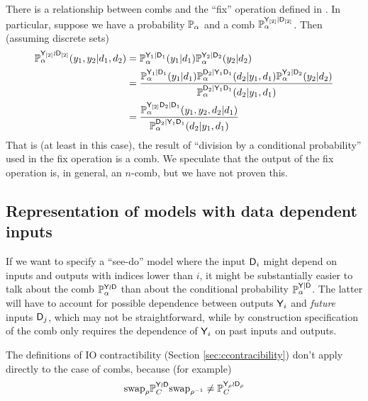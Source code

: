 There is a relationship between combs and the ``fix'' operation defined in \citet{richardson_nested_2017}. In particular, suppose we have a probability $\mathbb{P}_\alpha$ and a comb $\mathbb{P}_\alpha^{\mathsf{Y}_{[2]}|\mathsf{D}_{[2]}}$. Then (assuming discrete sets)
\begin{align}
    \mathbb{P}_\alpha^{\mathsf{Y}_{[2]}\wr \mathsf{D}_{[2]}}(y_1,y_2|d_1,d_2) &= \mathbb{P}_\alpha^{\mathsf{Y}_1|\mathsf{D}_1}(y_1|d_1)\mathbb{P}_\alpha^{\mathsf{Y}_2|\mathsf{D}_2}(y_2|d_2)\\
    &= \frac{\mathbb{P}_\alpha^{\mathsf{Y}_1|\mathsf{D}_1}(y_1|d_1)\mathbb{P}_\alpha^{\mathsf{D}_2|\mathsf{Y}_1\mathsf{D}_1}(d_2|y_1,d_1)\mathbb{P}_\alpha^{\mathsf{Y}_2|\mathsf{D}_2}(y_2|d_2)}{\mathbb{P}_\alpha^{\mathsf{D}_2|\mathsf{Y}_1\mathsf{D}_1}(d_2|y_1,d_1)}\\
    &= \frac{\mathbb{P}_\alpha^{\mathsf{Y}_{[2]}\mathsf{D}_2|\mathsf{D}_1}(y_1,y_2,d_2|d_1)}{\mathbb{P}_\alpha^{\mathsf{D}_2|\mathsf{Y}_1\mathsf{D}_1}(d_2|y_1,d_1)}
\end{align}
That is (at least in this case), the result of ``division by a conditional probability'' used in the fix operation is a comb. We speculate that the output of the fix operation is, in general, an $n$-comb, but we have not proven this.


\subsection[Representation of data-dependent inputs]{Representation of models with data dependent inputs}\label{sec:data_dependent_representation}

If we want to specify a ``see-do'' model where the input $\mathsf{D}_i$ might depend on inputs and outputs with indices lower than $i$, it might be substantially easier to talk about the comb $\mathbb{P}_\alpha^{\mathsf{Y}\wr \mathsf{D}}$ than about the conditional probability $\mathbb{P}_\alpha^{\mathsf{Y}|\mathsf{D}}$. The latter will have to account for possible dependence between outputs $\mathsf{Y}_i$ and \emph{future} inputs $\mathsf{D}_j$, which may not be straightforward, while by construction specification of the comb only requires the dependence of $\mathsf{Y}_i$ on past inputs and outputs.

The definitions of IO contractibility (Section \ref{sec:ccontracibility}) don't apply directly to the case of combs, because (for example) 
\begin{align}
    \text{swap}_{\rho} \mathbb{P}_C^{\mathsf{Y}\wr \mathsf{D}} \text{swap}_{\rho^{-1}} \neq \mathbb{P}_C^{\mathsf{Y}_{\rho}\wr \mathsf{D}_\rho}
\end{align}
 
